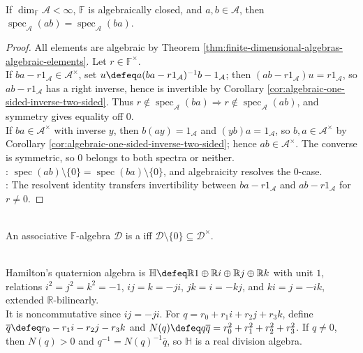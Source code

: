 \begin{proposition} \label{prop:algebra-spectra-of-ab-and-ba} \\
If $\dim_{\mathbb{F}}\mathcal{A}<\infty$, $\mathbb{F}$ is algebraically closed, and $a,b\in\mathcal{A}$, then $\operatorname{spec}_{\mathcal{A}}(ab)=\operatorname{spec}_{\mathcal{A}}(ba)$.
\begin{proof}
All elements are algebraic by Theorem \ref{thm:finite-dimensional-algebras-algebraic-elements}. Let $r\in\mathbb{F}^{\times}$.\\
If $ba-r1_{\mathcal{A}}\in\mathcal{A}^{\times}$, set $u\defeq a(ba-r1_{\mathcal{A}})^{-1}b-1_{\mathcal{A}}$; then $(ab-r1_{\mathcal{A}})u=r1_{\mathcal{A}}$, so $ab-r1_{\mathcal{A}}$ has a right inverse, hence is invertible by Corollary \ref{cor:algebraic-one-sided-inverse-two-sided}. Thus $r\notin\operatorname{spec}_{\mathcal{A}}(ba)\Rightarrow r\notin\operatorname{spec}_{\mathcal{A}}(ab)$, and symmetry gives equality off $0$.\\
If $ba\in\mathcal{A}^{\times}$ with inverse $y$, then $b(ay)=1_{\mathcal{A}}$ and $(yb)a=1_{\mathcal{A}}$, so $b,a\in\mathcal{A}^{\times}$ by Corollary \ref{cor:algebraic-one-sided-inverse-two-sided}; hence $ab\in\mathcal{A}^{\times}$. The converse is symmetric, so $0$ belongs to both spectra or neither.\\
: $\operatorname{spec}(ab)\setminus\{0\}=\operatorname{spec}(ba)\setminus\{0\}$, and algebraicity resolves the $0$-case.\\
: The resolvent identity transfers invertibility between $ba-r1_{\mathcal{A}}$ and $ab-r1_{\mathcal{A}}$ for $r\neq0$.
\end{proof}
\end{proposition}

\begin{definition} \label{def:division-algebra} \\
An associative $\mathbb{F}$-algebra $\mathcal{D}$ is a  iff $\mathcal{D}\setminus\{0\}\subseteq\mathcal{D}^{\times}$.
\end{definition}

\begin{example} \label{ex:hamilton-quaternions} \\
Hamilton's quaternion algebra is $\mathbb{H}\defeq\mathbb{R}1\oplus\mathbb{R}i\oplus\mathbb{R}j\oplus\mathbb{R}k$ with unit $1$,\\
relations $i^2=j^2=k^2=-1$, $ij=k=-ji$, $jk=i=-kj$, and $ki=j=-ik$, extended $\mathbb{R}$-bilinearly.\\
It is noncommutative since $ij=-ji$. For $q=r_0+r_1i+r_2j+r_3k$, define $\overline{q}\defeq r_0-r_1i-r_2j-r_3k$ and $N(q)\defeq q\overline{q}=r_0^2+r_1^2+r_2^2+r_3^2$.
If $q\neq0$, then $N(q)>0$ and $q^{-1}=N(q)^{-1}\overline{q}$, so $\mathbb{H}$ is a real division algebra.
\end{example}

